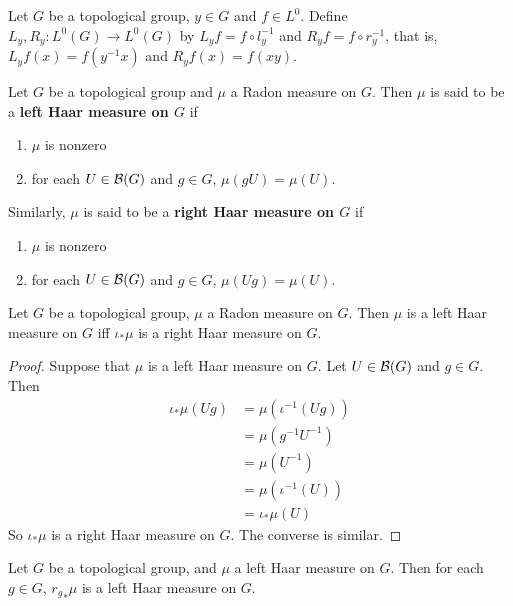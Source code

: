 \documentclass{book}
\begin{document}
	\begin{defn}  
		Let $G$ be a topological group, $y \in G$ and $f \in L^0$.  Define $L_y, R_y: L^0(G) \rightarrow L^0(G)$ by $L_y f = f \circ l_y^{-1}$ and $R_y f = f \circ r_y^{-1}$, that is, $L_yf(x) = f(y^{-1}x)$ and $R_yf(x) = f(xy)$.
	\end{defn}
	
	\begin{defn}  
		Let $G$ be a topological group and $\mu$ a Radon measure on $G$. Then $\mu$ is said to be a \textbf{left Haar measure on $G$} if 
		\begin{enumerate}
			\item $\mu$ is nonzero  
			\item for each $U \in \mathcal{B}(G)$ and $g \in G$, $\mu(gU) = \mu(U)$.  
		\end{enumerate}
		Similarly, $\mu$ is said to be a \textbf{right Haar measure on $G$} if 
		\begin{enumerate}
			\item $\mu$ is nonzero  
			\item for each $U \in \mathcal{B}(G)$ and $g \in G$, $\mu(Ug) = \mu(U)$.  
		\end{enumerate}
	\end{defn}
	
	\begin{ex}  
		Let $G$ be a topological group, $\mu$ a Radon measure on $G$. Then $\mu$ is a left Haar measure on $G$ iff $\iota_*\mu$ is a right Haar measure on $G$. 
	\end{ex}
	
	\begin{proof}
		Suppose that $\mu$ is a left Haar measure on $G$. Let $U \in \mathcal{B}(G)$ and $g \in G$. Then 
		\begin{align*}
			\iota_*\mu(Ug)
			& = \mu(\iota^{-1}(Ug)) \\
			&= \mu (g^{-1}U^{-1}) \\
			&= \mu (U^{-1}) \\
			&= \mu(\iota^{-1}(U)) \\
			&= \iota_*\mu(U)
		\end{align*}
		So $\iota_*\mu$ is a right Haar measure on $G$. The converse is similar.
	\end{proof}

	\begin{ex}  
		Let $G$ be a topological group, and $\mu$ a left Haar measure on $G$. Then for each $g \in G$, ${r_{g}}_*\mu$ is a left Haar measure on $G$.
	\end{ex}
\end{document}
